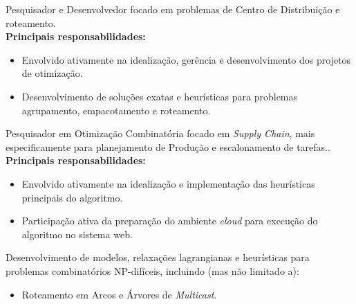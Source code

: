 \documentclass[10pt,a4paper,ragged2e,withhyper]{altacv}
\begin{document}
\begin{paracol}{2}
            {Pesquisador e Desenvolvedor focado em problemas de Centro de Distribuição e roteamento}. \\
            \medskip
            \textbf{Principais responsabilidades:}
            \medskip
            \begin{itemize}
                \item Envolvido ativamente na idealização, gerência e desenvolvimento dos projetos de otimização.
                \item Desenvolvimento de soluções exatas e heurísticas para problemas agrupamento, empacotamento e roteamento. 
            \end{itemize}
        \divider
        \medskip
            {Pesquisador em Otimização Combinatória focado em \textit{Supply Chain}, mais especificamente para planejamento de Produção e escalonamento de tarefas.}.\\
            \medskip
            \textbf{Principais responsabilidades:}
            \medskip
            \begin{itemize}
                \item Envolvido ativamente na idealização e implementação das heurísticas principais do algoritmo.
                \item Participação ativa da preparação do ambiente \textit{cloud} para execução do algoritmo no sistema web.
            \end{itemize}
	    {Desenvolvimento de modelos, relaxações lagrangianas e heurísticas para problemas combinatórios NP-difíceis, incluindo (mas não limitado a):} \\
	      \begin{itemize}
		        \item Roteamento em Arcos e Árvores de \textit{Multicast}.
		  \end{itemize}
		\divider
		{} \\
        \begin{itemize}

\end{itemize}
\end{paracol}
\end{document}

